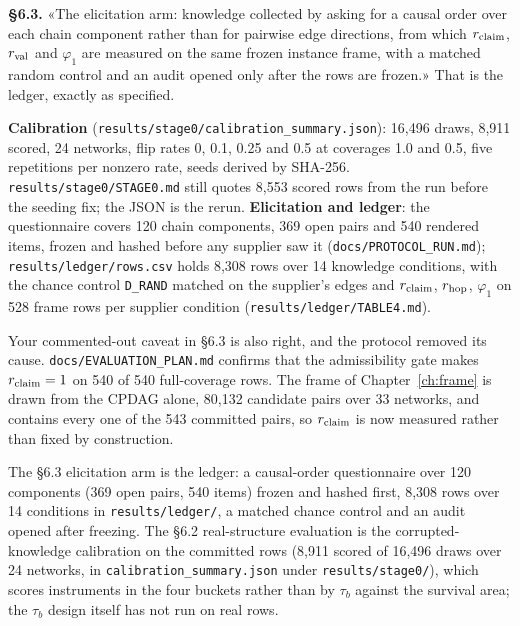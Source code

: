\textbf{\S6.3.} «The elicitation arm: knowledge collected by asking for a causal order over each chain
component rather than for pairwise edge directions, from which $r_{\mathrm{claim}}$, $r_{\mathrm{val}}$ and $\varphi_1$ are
measured on the same frozen instance frame, with a matched random control and an audit opened only after
the rows are frozen.» That is the ledger, exactly as specified.

\begin{medido}
\textbf{Calibration} (\texttt{results/\allowbreak stage0/\allowbreak calibration\_summary.json}): 16,496 draws, 8,911 scored,
24 networks, flip rates 0, 0.1, 0.25 and 0.5 at coverages 1.0 and 0.5, five repetitions per nonzero rate,
seeds derived by SHA-256. \texttt{results/\allowbreak stage0/\allowbreak STAGE0.md} still quotes 8,553 scored rows from the run before the
seeding fix; the JSON is the rerun.
\textbf{Elicitation and ledger}: the questionnaire covers 120 chain components, 369 open pairs and 540
rendered items, frozen and hashed before any supplier saw it (\texttt{docs/\allowbreak PROTOCOL\_RUN.md});
\texttt{results/\allowbreak ledger/\allowbreak rows.csv} holds 8,308 rows over 14 knowledge conditions, with the chance control
\texttt{D\_RAND} matched on the supplier's edges and $r_{\mathrm{claim}}$, $r_{\mathrm{hop}}$, $\varphi_1$ on 528 frame rows per
supplier condition (\texttt{results/\allowbreak ledger/\allowbreak TABLE4.md}).
\end{medido}

Your commented-out caveat in \S6.3 is also right, and the protocol removed its cause. \texttt{docs/\allowbreak EVALUATION\_PLAN.md}
confirms that the admissibility gate makes $r_{\mathrm{claim}} = 1$ on 540 of 540 full-coverage rows. The frame of
Chapter~\ref{ch:frame} is drawn from the CPDAG alone, 80,132 candidate pairs over 33 networks, and contains
every one of the 543 committed pairs, so $r_{\mathrm{claim}}$ is now measured rather than fixed by construction.

%
{The \S6.3 elicitation arm is the ledger: a causal-order questionnaire over 120 components (369 open
pairs, 540 items) frozen and hashed first, 8,308 rows over 14 conditions in \texttt{results/ledger/}, a
matched chance control and an audit opened after freezing. The \S6.2 real-structure evaluation is the
corrupted-knowledge calibration on the committed rows (8,911 scored of 16,496 draws over 24 networks, in
\texttt{calibration\_summary.json} under \texttt{results/stage0/}), which scores instruments in the four buckets rather than by
$\tau_b$ against the survival area; the $\tau_b$ design itself has not run on real rows.}


